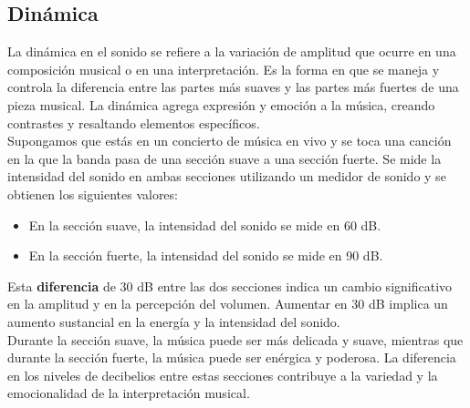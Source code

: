 \documentclass[
	12pt, %
	fleqn, %
	a4paper, %
	oneside, %
]{LegrandOrangeBook}
\begin{document}
\subsection{Dinámica}
La dinámica en el sonido se refiere a la variación de amplitud que ocurre en una composición musical o en una interpretación. Es la forma en que se maneja y controla la diferencia entre las partes más suaves y las partes más fuertes de una pieza musical. La dinámica agrega expresión y emoción a la música, creando contrastes y resaltando elementos específicos.\\
Supongamos que estás en un concierto de música en vivo y se toca una canción en la que la banda pasa de una sección suave a una sección fuerte. Se mide la intensidad del sonido en ambas secciones utilizando un medidor de sonido y se obtienen los siguientes valores:
\begin{itemize}
\item En la sección suave, la intensidad del sonido se mide en 60 dB.
\item En la sección fuerte, la intensidad del sonido se mide en 90 dB.
\end{itemize}
Esta \textbf{diferencia} de 30 dB entre las dos secciones indica un cambio significativo en la amplitud y en la percepción del volumen. Aumentar en 30 dB implica un aumento sustancial en la energía y la intensidad del sonido.\\
Durante la sección suave, la música puede ser más delicada y suave, mientras que durante la sección fuerte, la música puede ser enérgica y poderosa. La diferencia en los niveles de decibelios entre estas secciones contribuye a la variedad y la emocionalidad de la interpretación musical.\\
\end{document}
